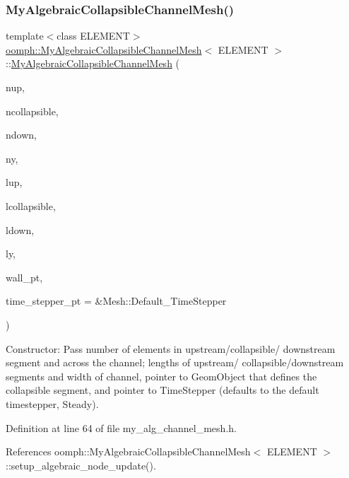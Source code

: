 \subsubsection{\texorpdfstring{My\+Algebraic\+Collapsible\+Channel\+Mesh()}{MyAlgebraicCollapsibleChannelMesh()}\hspace{0.1cm}{\footnotesize\ttfamily [1/2]}}
{\footnotesize\ttfamily template$<$class E\+L\+E\+M\+E\+NT$>$ \\
\hyperlink{classoomph_1_1MyAlgebraicCollapsibleChannelMesh}{oomph\+::\+My\+Algebraic\+Collapsible\+Channel\+Mesh}$<$ E\+L\+E\+M\+E\+NT $>$\+::\hyperlink{classoomph_1_1MyAlgebraicCollapsibleChannelMesh}{My\+Algebraic\+Collapsible\+Channel\+Mesh} (\begin{DoxyParamCaption}\item[{const unsigned \&}]{nup,  }\item[{const unsigned \&}]{ncollapsible,  }\item[{const unsigned \&}]{ndown,  }\item[{const unsigned \&}]{ny,  }\item[{const double \&}]{lup,  }\item[{const double \&}]{lcollapsible,  }\item[{const double \&}]{ldown,  }\item[{const double \&}]{ly,  }\item[{Geom\+Object $\ast$}]{wall\+\_\+pt,  }\item[{Time\+Stepper $\ast$}]{time\+\_\+stepper\+\_\+pt = {\ttfamily \&Mesh\+:\+:Default\+\_\+TimeStepper} }\end{DoxyParamCaption})\hspace{0.3cm}{\ttfamily [inline]}}



Constructor\+: Pass number of elements in upstream/collapsible/ downstream segment and across the channel; lengths of upstream/ collapsible/downstream segments and width of channel, pointer to Geom\+Object that defines the collapsible segment, and pointer to Time\+Stepper (defaults to the default timestepper, Steady). 



Definition at line 64 of file my\+\_\+alg\+\_\+channel\+\_\+mesh.\+h.



References oomph\+::\+My\+Algebraic\+Collapsible\+Channel\+Mesh$<$ E\+L\+E\+M\+E\+N\+T $>$\+::setup\+\_\+algebraic\+\_\+node\+\_\+update().

\mbox{\label{classoomph_1_1MyAlgebraicCollapsibleChannelMesh_a36eed7b6be90d44726091c6d97d53e3f}} 
